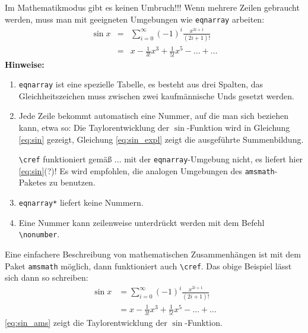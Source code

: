 \documentclass[ngerman,               %
               a4paper,               %
               fleqn,                 %
                     ]{scrartcl}       %
\begin{document}
Im Mathematikmodus gibt es keinen Umbruch!!! Wenn mehrere Zeilen gebraucht
werden, muss man mit geeigneten Umgebungen wie \texttt{eqnarray} arbeiten:
\begin{eqnarray}
  \label{eq:sin}%
  \sin x & = & \sum_{i=0}^{\infty}(-1)^{i}\frac{x^{2i+1}}{(2i+1)!}
  \\
  \label{eq:sin_expl}       & = & x - \frac{1}{3!}x^{3} + \frac{1}{5!}x^{5} - \ldots + \ldots
\end{eqnarray}
\textbf{Hinweise:}
\begin{enumerate}
  \item \texttt{eqnarray} ist eine spezielle Tabelle, es besteht aus drei
    Spalten, das Gleichheitszeichen muss zwischen zwei kaufmännische Unds
    gesetzt werden.
  \item Jede Zeile bekommt automatisch eine Nummer, auf die man sich
    beziehen kann, etwa so: Die Taylorentwicklung der \(\sin\)-Funktion
    wird in Gleichung \ref{eq:sin} gezeigt, Gleichung \ref{eq:sin_expl}
    zeigt die ausgeführte Summenbildung.

    \lstinline|\cref| funktioniert gemäß ...  mit der
    \texttt{eqnarray}-Umgebung nicht, es liefert hier \cref{eq:sin}(?)! Es
    wird empfohlen, die analogen Umgebungen des \texttt{amsmath}-Paketes zu
    benutzen.
  \item \texttt{eqnarray*} liefert keine Nummern.
  \item Eine Nummer kann zeilenweise unterdrückt werden mit dem
    Befehl \lstinline|\nonumber|.
\end{enumerate}

Eine einfachere Beschreibung von mathematischen Zusammenhängen ist mit dem
Paket \texttt{amsmath} möglich, dann funktioniert
auch \lstinline|\cref|. Das obige Beispiel lässt sich dann so schreiben:
\begin{equation}
    \begin{split}
      \label{eq:sin_ams}%
      \sin x &=  \sum_{i=0}^{\infty}(-1)^{i}\frac{x^{2i+1}}{(2i+1)!}
      \\
             &=  x - \frac{1}{3!}x^{3} + \frac{1}{5!}x^{5} - \ldots + \ldots
    \end{split}
\end{equation}
\cref{eq:sin_ams} zeigt die Taylorentwicklung der \(\sin\)-Funktion.
\end{document}
